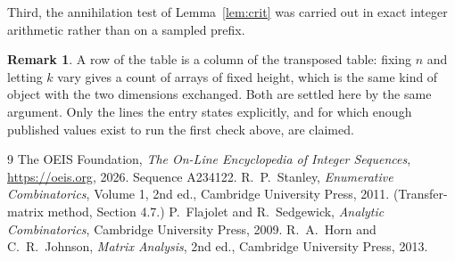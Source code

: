 \documentclass[11pt,a4paper]{article}
\theoremstyle{plain}
\theoremstyle{definition}
\newtheorem{remark}[theorem]{Remark}
\begin{document}
Third, the annihilation test of Lemma~\ref{lem:crit} was carried out in exact integer
arithmetic rather than on a sampled prefix.

\begin{remark}
A row of the table is a column of the transposed table: fixing $n$ and letting $k$ vary gives a
count of arrays of fixed height, which is the same kind of object with the two dimensions
exchanged. Both are settled here by the same argument. Only the lines the entry states
explicitly, and for which enough published values exist to run the first check above, are
claimed.
\end{remark}

\begin{thebibliography}{9}
 The OEIS Foundation, \emph{The On-Line Encyclopedia of Integer
Sequences}, \url{https://oeis.org}, 2026. Sequence A234122.
 R.~P.~Stanley, \emph{Enumerative Combinatorics}, Volume 1, 2nd ed.,
Cambridge University Press, 2011. (Transfer-matrix method, Section 4.7.)
 P.~Flajolet and R.~Sedgewick, \emph{Analytic Combinatorics}, Cambridge
University Press, 2009.
 R.~A.~Horn and C.~R.~Johnson, \emph{Matrix Analysis}, 2nd ed., Cambridge
University Press, 2013.
\end{thebibliography}
\end{document}
